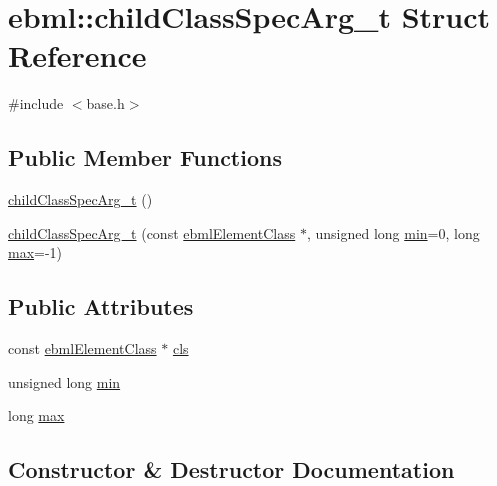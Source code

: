 \hypertarget{structebml_1_1childClassSpecArg__t}{}\section{ebml\+:\+:child\+Class\+Spec\+Arg\+\_\+t Struct Reference}
\label{structebml_1_1childClassSpecArg__t}


{\ttfamily \#include $<$base.\+h$>$}

\subsection*{Public Member Functions}
\begin{DoxyCompactItemize}
\item 
\mbox{\hyperlink{structebml_1_1childClassSpecArg__t_a4edec7feee4a65372ddd700b365fda36}{child\+Class\+Spec\+Arg\+\_\+t}} ()
\item 
\mbox{\hyperlink{structebml_1_1childClassSpecArg__t_a9f730585de19089fb0ac3ebdfaeb566c}{child\+Class\+Spec\+Arg\+\_\+t}} (const \mbox{\hyperlink{classebml_1_1ebmlElementClass}{ebml\+Element\+Class}} $\ast$, unsigned long \mbox{\hyperlink{structebml_1_1childClassSpecArg__t_a9977e316218f91a7c6f2c4793dcb9192}{min}}=0, long \mbox{\hyperlink{structebml_1_1childClassSpecArg__t_aff67f3fd2cbebbf2c8f4f533b790e62c}{max}}=-\/1)
\end{DoxyCompactItemize}
\subsection*{Public Attributes}
\begin{DoxyCompactItemize}
\item 
const \mbox{\hyperlink{classebml_1_1ebmlElementClass}{ebml\+Element\+Class}} $\ast$ \mbox{\hyperlink{structebml_1_1childClassSpecArg__t_a0bbd25beadc7caf9837ae2fe9381ed16}{cls}}
\item 
unsigned long \mbox{\hyperlink{structebml_1_1childClassSpecArg__t_a9977e316218f91a7c6f2c4793dcb9192}{min}}
\item 
long \mbox{\hyperlink{structebml_1_1childClassSpecArg__t_aff67f3fd2cbebbf2c8f4f533b790e62c}{max}}
\end{DoxyCompactItemize}


\subsection{Constructor \& Destructor Documentation}
\mbox{\label{structebml_1_1childClassSpecArg__t_a4edec7feee4a65372ddd700b365fda36}} 
